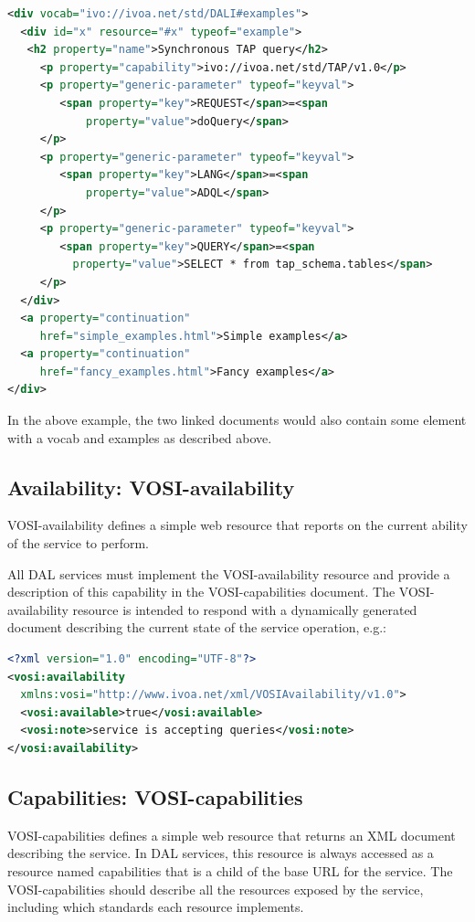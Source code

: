\documentclass[11pt,letter]{ivoa}
\begin{document}
\begin{lstlisting}[language=XML,basicstyle=\footnotesize]
<div vocab="ivo://ivoa.net/std/DALI#examples">
  <div id="x" resource="#x" typeof="example">
   <h2 property="name">Synchronous TAP query</h2>
     <p property="capability">ivo://ivoa.net/std/TAP/v1.0</p>
     <p property="generic-parameter" typeof="keyval">
        <span property="key">REQUEST</span>=<span
            property="value">doQuery</span>
     </p>
     <p property="generic-parameter" typeof="keyval">
        <span property="key">LANG</span>=<span
            property="value">ADQL</span>
     </p>
     <p property="generic-parameter" typeof="keyval">
        <span property="key">QUERY</span>=<span
          property="value">SELECT * from tap_schema.tables</span>
     </p>
  </div>
  <a property="continuation"
     href="simple_examples.html">Simple examples</a>
  <a property="continuation"
     href="fancy_examples.html">Fancy examples</a>
</div>
\end{lstlisting}

In the above example, the two linked documents would also contain some element 
with a vocab and examples as described above. 

\subsection{Availability: VOSI-availability}
\label{sec:vosi-availability}
VOSI-availability \citep{std:VOSI} defines a simple web resource that 
reports on the current ability of the service to perform. 

All DAL services must implement the VOSI-availability resource and provide a description
of this capability in the VOSI-capabilities document. The VOSI-availability resource is
intended to respond with a dynamically generated document describing the current state of the service 
operation, e.g.:

\begin{lstlisting}[language=XML,basicstyle=\footnotesize]
<?xml version="1.0" encoding="UTF-8"?>
<vosi:availability  
  xmlns:vosi="http://www.ivoa.net/xml/VOSIAvailability/v1.0">
  <vosi:available>true</vosi:available>
  <vosi:note>service is accepting queries</vosi:note>
</vosi:availability>
\end{lstlisting}

\subsection{Capabilities: VOSI-capabilities}
\label{sec:vosi-capabilities}
VOSI-capabilities \citep{std:VOSI} defines a simple web resource that 
returns an XML document 
describing the service. In  DAL services, this resource is always accessed as a 
resource named capabilities that is a child of the base URL for the service. The 
VOSI-capabilities should describe all the resources exposed by the service, 
including which standards each resource implements.
\end{document}
